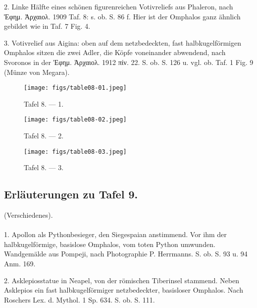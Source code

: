 \documentclass[a4paper, 11pt, oneside]{article}
\begin{document}
2. Linke Hälfte eines schönen figurenreichen Votivreliefs aus Phaleron, nach Ἐφημ. Ἀρχαιολ. 1909 Taf. 8: s. ob. S. 86 f. Hier ist der Omphalos ganz ähnlich gebildet wie in Taf. 7 Fig. 4.

3. Votivrelief aus Aigina: oben auf dem netzbedeckten, fast halbkugelförmigen Omphalos sitzen die zwei Adler, die Köpfe voneinander abwendend, nach Svoronos in der Ἐφημ. Ἀρχαιολ. 1912 πίν. 22. S. ob. S. 126 u. vgl. ob. Taf. 1 Fig. 9 (Münze von Megara).
\clearpage
\clearpage
\vspace*{\fill}
\begin{figure}[H]
\centering
\texttt{[image: figs/table08-01.jpeg]}
\caption{\swabfamily Tafel 8. --- 1.}
\end{figure}
\vspace*{\fill}
\clearpage
\vspace*{\fill}
\begin{figure}[H]
\centering
\texttt{[image: figs/table08-02.jpeg]}
\caption{\swabfamily Tafel 8. --- 2.}
\end{figure}
\vspace*{\fill}
\clearpage
\vspace*{\fill}
\begin{figure}[H]
\centering
\texttt{[image: figs/table08-03.jpeg]}
\caption{\swabfamily Tafel 8. --- 3.}
\end{figure}
\vspace*{\fill}
\clearpage

\subsection{Erläuterungen zu Tafel 9.}
\begin{center}
(Verschiedenes).
\end{center}
\paragraph{}
1. Apollon als Pythonbesieger, den Siegespaian anstimmend. Vor ihm der halbkugelförmige, basislose Omphalos, vom toten Python umwunden. Wandgemälde aus Pompeji, nach Photographie P. Herrmanns. S. ob. S. 93 u. 94 Anm. 169.

2. Asklepiosstatue in Neapel, von der römischen Tiberinsel stammend. Neben Asklepios ein fast halbkugelförmiger netzbedeckter, basisloser Omphalos. Nach Roschers Lex. d. Mythol. 1 Sp. 634. S. ob. S. 111.
\end{document}
